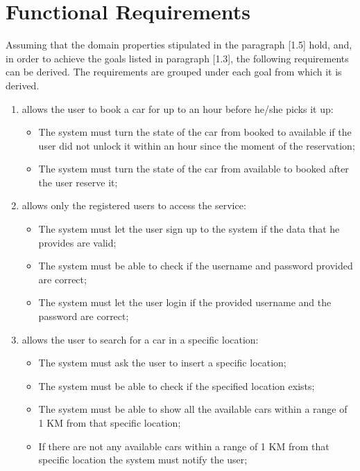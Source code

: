 \section{Functional Requirements}
Assuming that the domain properties stipulated in the paragraph [1.5] hold, and, in order to achieve the goals listed in paragraph [1.3], the following requirements can be derived. The requirements are grouped under each goal from which it is derived.

\begin{enumerate}

\item allows the user to book a car for up to an hour before he/she picks it up:

\begin{itemize}
\item The system must turn the state of the car from booked to available if the user did not unlock it within an hour since the moment of the reservation;
\item The system must turn the state of the car from available to booked after the user reserve it;
\end{itemize}

\item allows only the registered users to access the service:

\begin{itemize}
\item The system must let the user sign up to the system if the data that he provides are valid; %
\item The system must be able to check if the username and password provided are correct;
\item The system must let the user login if the provided username and the password are correct;
\end{itemize}

\item allows the user to search for a car in a specific location:

\begin{itemize}
\item The system must ask the user to insert a specific location;
\item The system must be able to check if the specified location exists;
\item The system must be able to show all the available cars within a range of 1 KM from that specific location;
\item If there are not any available cars within a range of 1 KM from that specific location the system must notify the user;
\end{itemize}


\end{enumerate}
